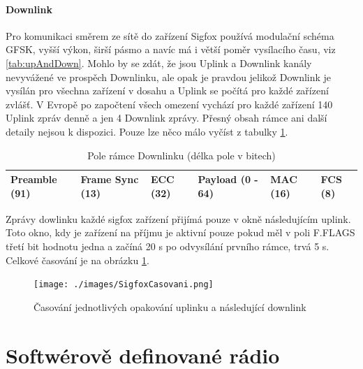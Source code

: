 \documentclass{ctuthesis}
\begin{document}
\subsubsection{Downlink}
Pro komunikaci směrem ze sítě do zařízení Sigfox používá modulační schéma GFSK, vyšší výkon, širší pásmo a navíc má i větší poměr vysílacího času, viz \ref{tab:upAndDown}. Mohlo by se zdát, že jsou Uplink a Downlink kanály nevyvážené ve prospěch Downlinku, ale opak je pravdou jelikož Downlink je vysílán pro všechna zařízení v dosahu a Uplink se počítá pro každé zařízení zvlášť. V Evropě po započtení všech omezení vychází pro každé zařízení 140 Uplink zpráv denně a jen 4 Downlink zprávy. Přesný obsah rámce ani další detaily nejsou k dispozici. Pouze lze něco málo vyčíst z tabulky \ref{tab:downlinkFrame}. \\
\begin{table}[]
\begin{tabular}{@{}|l|l|l|l|l|l|@{}}
\toprule
Preamble (91) & Frame Sync (13) & ECC (32) & Payload (0 - 64) & MAC (16) & FCS (8) \\ \bottomrule
\end{tabular}
\caption{Pole rámce Downlinku (délka pole v bitech) \cite{sifoxdecr}}
\label{tab:downlinkFrame}

\end{table}
Zprávy dowlinku každé sigfox zařízení přijímá pouze v okně následujícím uplink. Toto okno, kdy je zařízení na příjmu je aktivní pouze pokud měl v poli F.FLAGS třetí bit hodnotu jedna a začíná 20 s po odvysílání prvního rámce, trvá 5 s. Celkové časování je na obrázku \ref{sigfoxCasovani}.
\begin{figure}
\caption{Časování jednotlivých opakování uplinku a následující downlink \cite{perrylea}}
\texttt{[image: ./images/SigfoxCasovani.png]}
\label{sigfoxCasovani}
\end{figure}

\chapter{Softwérově definované rádio} \label{chapter:sdr}
\end{document}
